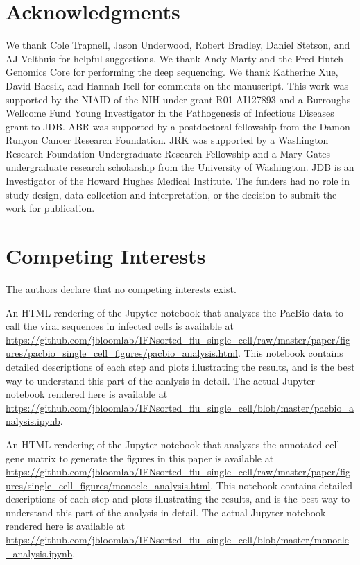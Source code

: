\documentclass[9pt,lineno]{elife}
\begin{document}
\section{Acknowledgments}
We thank Cole Trapnell, Jason Underwood, Robert Bradley, Daniel Stetson, and AJ Velthuis for helpful suggestions.
We thank Andy Marty and the Fred Hutch Genomics Core for performing the deep sequencing.
We thank Katherine Xue, David Bacsik, and Hannah Itell for comments on the manuscript.
This work was supported by the NIAID of the NIH under grant R01 AI127893 and a Burroughs Wellcome Fund Young Investigator in the Pathogenesis of Infectious Diseases grant to JDB.
ABR was supported by a postdoctoral fellowship from the Damon Runyon Cancer Research Foundation.
JRK was supported by a Washington Research Foundation Undergraduate Research Fellowship and a Mary Gates undergraduate research scholarship from the University of Washington.
JDB is an Investigator of the Howard Hughes Medical Institute.
The funders had no role in study design, data collection and interpretation, or the decision to submit the work for publication.

\section{Competing Interests}
The authors declare that no competing interests exist.

\nolinenumbers



\clearpage

\begin{suppfile}
\caption{\label{suppfile:pacbio_analysis}
An HTML rendering of the Jupyter notebook that analyzes the PacBio data to call the viral sequences in infected cells is available at \url{https://github.com/jbloomlab/IFNsorted_flu_single_cell/raw/master/paper/figures/pacbio_single_cell_figures/pacbio_analysis.html}.
This notebook contains detailed descriptions of each step and plots illustrating the results, and is the best way to understand this part of the analysis in detail.
The actual Jupyter notebook rendered here is available at \url{https://github.com/jbloomlab/IFNsorted_flu_single_cell/blob/master/pacbio_analysis.ipynb}.}
\end{suppfile}

\begin{suppfile}
\caption{\label{suppfile:monocle_analysis}
An HTML rendering of the Jupyter notebook that analyzes the annotated cell-gene matrix to generate the figures in this paper is available at \url{https://github.com/jbloomlab/IFNsorted_flu_single_cell/raw/master/paper/figures/single_cell_figures/monocle_analysis.html}.
This notebook contains detailed descriptions of each step and plots illustrating the results, and is the best way to understand this part of the analysis in detail.
The actual Jupyter notebook rendered here is available at \url{https://github.com/jbloomlab/IFNsorted_flu_single_cell/blob/master/monocle_analysis.ipynb}.}
\end{suppfile}
\end{document}
